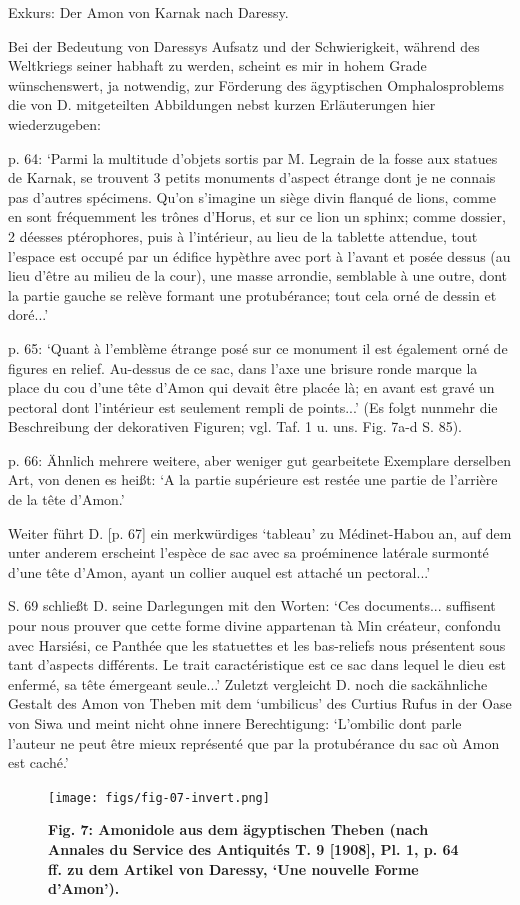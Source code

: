 \documentclass[a4paper, 11pt, oneside]{article}
\begin{document}
Exkurs: Der Amon von Karnak nach Daressy.

Bei der Bedeutung von Daressys Aufsatz und der Schwierigkeit, während des Weltkriegs seiner habhaft zu werden, scheint es mir in hohem Grade wünschenswert, ja notwendig, zur Förderung des ägyptischen Omphalosproblems die von D. mitgeteilten Abbildungen nebst kurzen Erläuterungen hier wiederzugeben:

p. 64: `Parmi la multitude d'objets sortis par M. Legrain de la fosse aux statues de Karnak, se trouvent 3 petits monuments d'aspect étrange dont je ne connais pas d'autres spécimens. Qu'on s'imagine un siège divin flanqué de lions, comme en sont fréquemment les trônes d'Horus, et sur ce lion un sphinx; comme dossier, 2 déesses ptérophores, puis à l'intérieur, au lieu de la tablette attendue, tout l'espace est occupé par un édifice hypèthre avec port à l'avant et posée dessus (au lieu d'être au milieu de la cour), une masse arrondie, semblable à une outre, dont la partie gauche se relève formant une protubérance; tout cela orné de dessin et doré...'

p. 65: `Quant à l'emblème étrange posé sur ce monument il est également orné de figures en relief. Au-dessus de ce sac, dans l'axe une brisure ronde marque la place du cou d'une tête d'Amon qui devait être placée là; en avant est gravé un pectoral dont l'intérieur est seulement rempli de points...' (Es folgt nunmehr die Beschreibung der dekorativen Figuren; vgl. Taf. 1 u. uns. Fig. 7a-d S. 85).

p. 66: Ähnlich mehrere weitere, aber weniger gut gearbeitete Exemplare derselben Art, von denen es heißt: `A la partie supérieure est restée une partie de l'arrière de la tête d'Amon.'

Weiter führt D. [p. 67] ein merkwürdiges `tableau' zu Médinet-Habou an, auf dem unter anderem erscheint l'espèce de sac avec sa proéminence latérale surmonté d'une tête d'Amon, ayant un collier auquel est attaché un pectoral...'

S. 69 schließt D. seine Darlegungen mit den Worten: `Ces documents... suffisent pour nous prouver que cette forme divine appartenan tà Min créateur, confondu avec Harsiési, ce Panthée que les statuettes et les bas-reliefs nous présentent sous tant d'aspects différents. Le trait caractéristique est ce sac dans lequel le dieu est enfermé, sa tête émergeant seule...' Zuletzt vergleicht D. noch die sackähnliche Gestalt des Amon von Theben mit dem `umbilicus' des Curtius Rufus in der Oase von Siwa und meint nicht ohne innere Berechtigung: `L'ombilic dont parle l'auteur ne peut être mieux représenté que par la protubérance du sac où Amon est caché.'
\clearpage
\vspace*{\fill}
\begin{figure}[H]
\centering
\texttt{[image: figs/fig-07-invert.png]}
\caption{\bfseries Fig. 7: Amonidole aus dem ägyptischen Theben (nach Annales du Service des Antiquités T. 9 [1908], Pl. 1, p. 64 ff. zu dem Artikel von Daressy, `Une nouvelle Forme d'Amon').}
\end{figure}
\vspace*{\fill}
\clearpage
\end{document}
